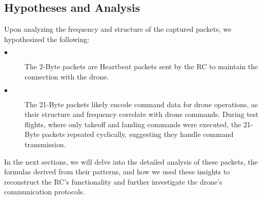\subsection*{Hypotheses and Analysis}
Upon analyzing the frequency and structure of the captured packets, we hypothesized the following:
\begin{description}
  \item[$\bullet$]  The 2-Byte packets are Heartbeat packets sent by the RC to maintain the connection with the drone.
  \item[$\bullet$]  The 21-Byte packets likely encode command data for drone operations, as their structure and frequency correlate with drone commands. During test flights, where only takeoff and landing commands were executed, the 21-Byte packets repeated cyclically, suggesting they handle command transmission.
\end{description}
In the next sections, we will delve into the detailed analysis of these packets, the formulas derived from their patterns, and how we used these insights to reconstruct the RC's functionality and further investigate the drone's communication protocols.